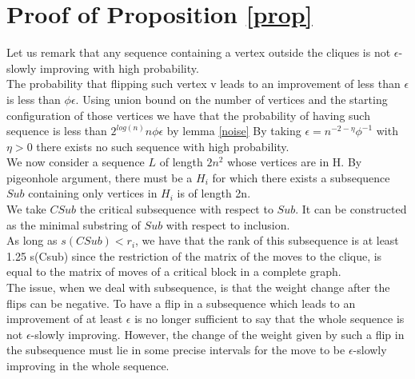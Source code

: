 \documentclass[12pt]{article}
\begin{document}
\section{Proof of Proposition \ref{prop}}
\label{coreProof}

Let us remark that any sequence containing a vertex outside the cliques is not $\epsilon$-slowly improving with high probability. \\
The probability that flipping such vertex v leads to an improvement of less than $\epsilon$ is less than $\phi \epsilon$. Using union bound on the number of vertices and the starting configuration of those vertices we have that the probability of having such sequence is less than $2^{log(n)}n \phi \epsilon$ by lemma \ref{noise}
By taking $\epsilon = n^{-2 - \eta} \phi^{-1}$ with $\eta > 0$ there exists no such sequence with high probability. \\

We now consider  a sequence $L$ of length $2n^2$ whose vertices are in H. By pigeonhole argument, there must be a $H_i$ for which there exists a subsequence $Sub$ containing only vertices in $H_i$ is of length 2n. \\
We take $CSub$ the critical subsequence with respect to $Sub$. It can be constructed as the minimal substring of $Sub$ with respect to inclusion.\\
As long as $s(CSub) < r_i$, we have that the rank of this subsequence is at least 1.25 s(Csub) since the restriction of the matrix of the moves to the clique, is equal to the matrix of moves of a critical block in a complete graph.\\
The issue, when we deal with subsequence, is that the weight change after the flips can be negative. To have a flip in a subsequence which leads to an improvement of at least $\epsilon$ is no longer sufficient to say that the whole sequence is not $\epsilon$-slowly improving. However, the change of the weight given by such a flip in the subsequence must lie in some precise intervals for the move to be $\epsilon$-slowly improving in the whole sequence. \\
\end{document}
